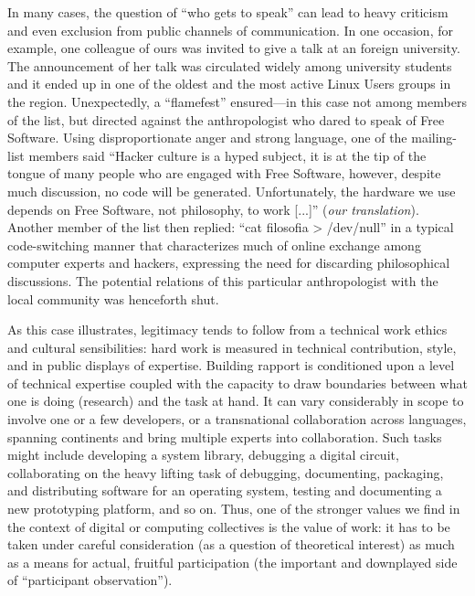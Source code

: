 \documentclass[10pt,letter,oneside]{scrartcl}
\begin{document}
In many cases, the question of ``who gets to speak'' can lead to heavy
criticism and even exclusion from public channels of communication.
In one occasion, for example, one colleague of ours was invited to
give a talk at an foreign university. The announcement of her talk was
circulated widely among university students and it ended up in one of
the oldest and the most active Linux Users groups in the
region. Unexpectedly, a ``flamefest'' ensured---in this case not among
members of the list, but directed against the anthropologist who dared
to speak of Free Software. Using disproportionate anger and strong
language, one of the mailing-list members said ``Hacker culture is a
hyped subject, it is at the tip of the tongue of many people who are
engaged with Free Software, however, despite much discussion, no code
will be generated. Unfortunately, the hardware we use depends on Free
Software, not philosophy, to work {[}...{]}'' (\emph{our
  translation}). Another member of the list then replied: ``cat
filosofia \textgreater{} /dev/null'' in a typical code-switching
manner that characterizes much of online exchange among computer
experts and hackers, expressing the need for discarding philosophical
discussions.  The potential relations of this particular
anthropologist with the local community was henceforth shut.


As this case illustrates, legitimacy tends to follow from a technical
work ethics and cultural sensibilities: hard work is measured in
technical contribution, style, and in public displays of
expertise. Building rapport is conditioned upon a level of technical
expertise coupled with the capacity to draw boundaries between what
one is doing (research) and the task at hand. It can vary considerably
in scope to involve one or a few developers, or a transnational
collaboration across languages, spanning continents and bring multiple
experts into collaboration.  Such tasks might include developing a
system library, debugging a digital circuit, collaborating on the
heavy lifting task of debugging, documenting, packaging, and
distributing software for an operating system, testing and documenting
a new prototyping platform, and so on. Thus, one of the stronger
values we find in the context of digital or computing collectives is the value of
work: it has to be taken under careful consideration (as a question of
theoretical interest) as much as a means for actual, fruitful
participation (the important and downplayed side of ``participant
observation'').
\end{document}
